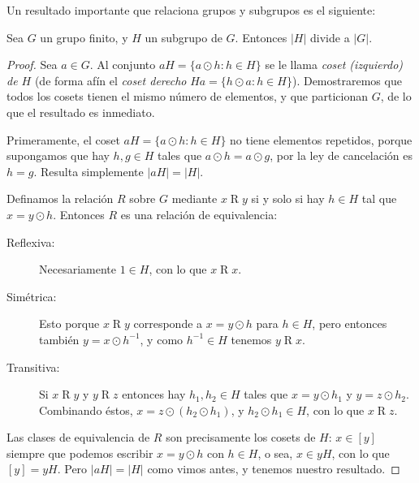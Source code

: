   Un resultado importante que relaciona grupos y subgrupos es el siguiente:%
  \begin{theorem}[Lagrange]
    \label{theo:Lagrange}
    Sea \(G\) un grupo finito,
    y \(H\) un subgrupo de \(G\).
    Entonces \(\lvert H \rvert\) divide a \(\lvert G \rvert\).
  \end{theorem}
  \begin{proof}
    Sea \(a \in G\).
    Al conjunto \(a H = \{a \odot h \colon h \in H\}\)
    se le llama \emph{coset (izquierdo) de \(H\)}%
    (de forma afín el \emph{coset derecho}
     \(H a = \{h \odot a \colon h \in H\}\)).
    Demostraremos que todos los cosets tienen el mismo número de elementos,
    y que particionan \(G\),
    de lo que el resultado es inmediato.

    Primeramente,
    el coset \(a H = \{a \odot h \colon h \in H\}\)
    no tiene elementos repetidos,
    porque supongamos que hay \(h, g \in H\) tales que
    \(a \odot h = a \odot g\),
    por la ley de cancelación es \(h = g\).
    Resulta simplemente \(\lvert a H \rvert = \lvert H \rvert\).

    Definamos la relación \(R\) sobre \(G\) mediante
    \(x \mathrel{R} y\) si y solo si
    hay \(h \in H\) tal que \(x = y \odot h\).
    Entonces \(R\) es una relación de equivalencia:%
    \begin{description}
    \item[Reflexiva:]
      Necesariamente \(1 \in H\),
      con lo que \(x \mathrel{R} x\).
    \item[Simétrica:]
      Esto porque \(x \mathrel{R} y\) corresponde a \(x = y \odot h\)
      para \(h \in H\),
      pero entonces también \(y = x \odot h^{-1}\),
      y como \(h^{-1} \in H\) tenemos \(y \mathrel{R} x\).
    \item[Transitiva:]
      Si \(x \mathrel{R} y\) y \(y \mathrel{R} z\)
      entonces hay \(h_1, h_2 \in H\) tales que
      \(x = y \odot h_1\) y \(y = z \odot h_2\).
      Combinando éstos,
      \(x = z \odot (h_2 \odot h_1)\),
      y \(h_2 \odot h_1 \in H\),
      con lo que \(x \mathrel{R} z\).
    \end{description}
    Las clases de equivalencia de \(R\) son precisamente los cosets de \(H\):
    \(x \in [y]\) siempre que podemos escribir \(x = y \odot h\)
    con \(h \in H\),
     o sea, \(x \in y H\),
     con lo que \([y] = y H\).
    Pero \(\lvert a H \rvert = \lvert H \rvert\)
    como vimos antes,
    y tenemos nuestro resultado.
  \end{proof}

